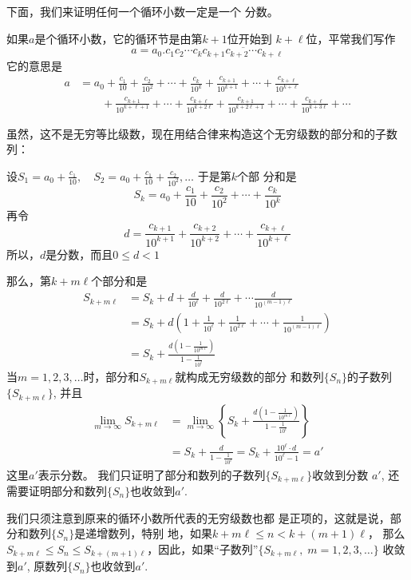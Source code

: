 下面，我们来证明任何一个循环小数一定是一个
分数。

如果$a$是个循环小数，它的循环节是由第$k+1$位开始到
$k+\ell$位，平常我们写作
\[a=a_0.c_1c_2\cdots c_k\overline{c_{k+1}c_{k+2}\cdots c_{k+\ell}}\]
它的意思是
\[\begin{split}
    a&=a_0+\frac{c_1}{10}+\frac{c_2}{10^2}+\cdots +\frac{c_k}{10^k}+\frac{c_{k+1}}{10^{k+1}}+\cdots+\frac{c_{k+\ell}}{10^{k+\ell}}\\
&\qquad +\frac{c_{k+1}}{10^{k+\ell+1}}+\cdots+\frac{c_{k+\ell}}{10^{k+2\ell}}+\frac{c_{k+1}}{10^{k+2\ell+1}}+\cdots+\frac{c_{k+\ell}}{10^{k+3\ell}}+\cdots
\end{split}\]

虽然，这不是无穷等比级数，现在用结合律来构造这个无穷级数的部分和的子数列：

设$S_1=a_0+\frac{c_1}{10},\quad S_2=a_0+\frac{c_1}{10}+\frac{c_2}{10^2},\ldots$ 于是第$k$个部
分和是
\[S_k=a_0+\frac{c_1}{10}+\frac{c_2}{10^2}+\cdots+\frac{c_k}{10^k}\]
再令
\[d=\frac{c_{k+1}}{10^{k+1}}+\frac{c_{k+2}}{10^{k+2}}+\cdots +\frac{c_{k+\ell}}{10^{k+\ell}}\]
所以，$d$是分数，而且$0\le d<1$

那么，第$k+m\ell$个部分和是
\[\begin{split}
    S_{k+m\ell}&=S_k+d+\frac{d}{10^{\ell}}+\frac{d}{10^{2\ell}}+\cdots \frac{d}{10^{(m-1)\ell}}\\
    &=S_k+d\left(1+\frac{1}{10^{\ell}}+\frac{1}{10^{2\ell}}+\cdots +\frac{1}{10^{(m-1)\ell}}\right)\\
    &=S_k+\frac{d\left(1-\frac{1}{10^{m\ell}}\right)}{1-\frac{1}{10^{\ell}}}
\end{split}\]
当$m=1,2,3,\ldots$时，部分和$S_{k+m\ell}$就构成无穷级数的部分
和数列$\{S_n\}$的子数列$\{S_{k+m\ell}\}$, 并且
\[\begin{split}
    \lim_{m\to\infty}S_{k+m\ell}&= \lim_{m\to\infty}\left\{S_k+\frac{d\left(1-\frac{1}{10^{m\ell}}\right)}{1-\frac{1}{10^{\ell}}}\right\}\\
    &=S_k+\frac{d}{1-\frac{1}{10^{\ell}}}=S_k+\frac{10^{\ell}\cdot d}{10^{\ell}-1}=a'
\end{split}\]
这里$a'$表示分数。
我们只证明了部分和数列的子数列$\{S_{k+m\ell}\}$收敛到分数
$a'$, 还需要证明部分和数列$\{S_n\}$也收敛到$a'$.

我们只须注意到原来的循环小数所代表的无穷级数也都
是正项的，这就是说，部分和数列$\{S_n\}$是递增数列，特别
地，如果$k+m\ell\le n<k+(m+1)\ell$，
那么$S_{k+m\ell}\le S_n\le S_{k+(m+1)\ell}$，因此，如果“子数列”$\{S_{k+m\ell},\; m=1,2,3,\ldots\}$
收敛到$a'$, 原数列$\{S_n\}$也收敛到$a'$.

